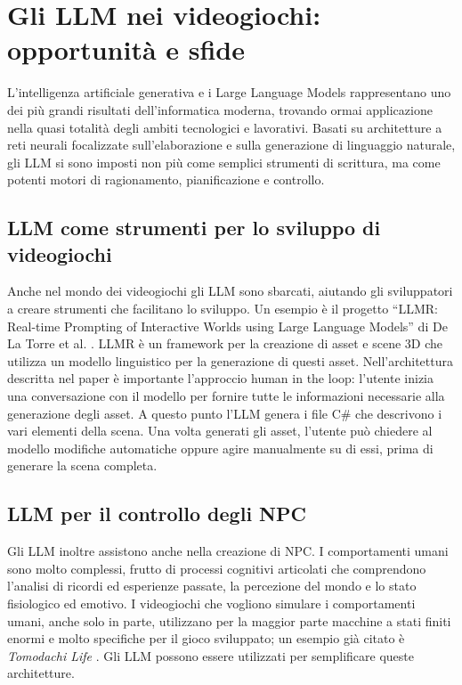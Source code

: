 \section{Gli LLM nei videogiochi: opportunità e sfide}

L’intelligenza artificiale generativa e i Large Language Models rappresentano uno dei più grandi risultati dell’informatica moderna, trovando ormai applicazione nella quasi totalità degli ambiti tecnologici e lavorativi. Basati su architetture a reti neurali focalizzate sull'elaborazione e sulla generazione di linguaggio naturale, gli LLM si sono imposti non più come semplici strumenti di scrittura, ma come potenti motori di ragionamento, pianificazione e controllo.

\subsection{LLM come strumenti per lo sviluppo di videogiochi}

Anche nel mondo dei videogiochi gli LLM sono sbarcati, aiutando gli sviluppatori a creare strumenti che facilitano lo sviluppo. Un esempio è il progetto ``LLMR: Real-time Prompting of Interactive Worlds using Large Language Models'' di De La Torre et al. \cite{delatorre2024llmr}. LLMR è un framework per la creazione di asset e scene 3D che utilizza un modello linguistico per la generazione di questi asset. Nell'architettura descritta nel paper è importante l'approccio human in the loop: l'utente inizia una conversazione con il modello per fornire tutte le informazioni necessarie alla generazione degli asset. A questo punto l'LLM genera i file C\# che descrivono i vari elementi della scena. Una volta generati gli asset, l'utente può chiedere al modello modifiche automatiche oppure agire manualmente su di essi, prima di generare la scena completa.

\subsection{LLM per il controllo degli NPC}

Gli LLM inoltre assistono anche nella creazione di NPC. I comportamenti umani sono molto complessi, frutto di processi cognitivi articolati che comprendono l'analisi di ricordi ed esperienze passate, la percezione del mondo e lo stato fisiologico ed emotivo. I videogiochi che vogliono simulare i comportamenti umani, anche solo in parte, utilizzano per la maggior parte macchine a stati finiti enormi e molto specifiche per il gioco sviluppato; un esempio già citato è \textit{Tomodachi Life} \cite{tomodachilife}. Gli LLM possono essere utilizzati per semplificare queste architetture.

